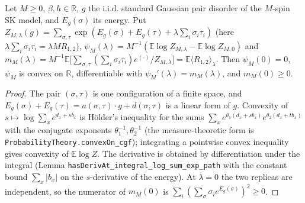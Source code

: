 \begin{theorem}
\label{thm:sg-tal:coupled-calculus}
  \leanok
{}
Let $M\ge0$, $\beta,h\in\mathbb R$, $g$ the i.i.d. standard Gaussian pair disorder of the $M$-spin SK model, and
$E_g(\sigma)$ its energy.  Put $Z_{M,\lambda}(g)=\sum_{\sigma,\tau}\exp(E_g(\sigma)+E_g(\tau)+\lambda\sum_i\sigma_i\tau_i)$
(here $\lambda\sum_i\sigma_i\tau_i=\lambda M R_{1,2}$), $\psi_M(\lambda)=M^{-1}(\mathbb E\log Z_{M,\lambda}-\mathbb E\log Z_{M,0})$ and
$m_M(\lambda)=M^{-1}\mathbb E\big[\sum_{\sigma,\tau}(\sum_i\sigma_i\tau_i)e^{(\cdot)}/Z_{M,\lambda}\big]=\mathbb E\langle R_{1,2}\rangle_\lambda$.
Then $\psi_M(0)=0$, $\psi_M$ is convex on $\mathbb R$, differentiable with $\psi_M'(\lambda)=m_M(\lambda)$, and $m_M(0)\ge0$.
\end{theorem}
\begin{proof}
  \leanok
The pair $(\sigma,\tau)$ is one configuration of a finite space, and $E_g(\sigma)+E_g(\tau)=a(\sigma,\tau)\cdot g+d(\sigma,\tau)$ is a linear form of $g$.
Convexity of $s\mapsto\log\sum_xe^{d_x+sb_x}$ is H\"older's inequality for the sums $\sum_x e^{\theta_1(d_x+sb_x)}e^{\theta_2(d_x+tb_x)}$ with the conjugate exponents $\theta_1^{-1},\theta_2^{-1}$ (the measure-theoretic form is \texttt{ProbabilityTheory.convexOn\_cgf}); integrating a pointwise convex inequality gives convexity of $\mathbb E\log Z$.  The derivative is obtained by differentiation under
the integral (Lemma \texttt{hasDerivAt\_integral\_log\_sum\_exp\_path} with the constant bound $\sum_x|b_x|$ on the $s$-derivative of the energy).
At $\lambda=0$ the two replicas are independent, so the numerator of $m_M(0)$ is $\sum_i(\sum_\sigma\sigma_ie^{E_g(\sigma)})^2\ge0$.
\end{proof}

